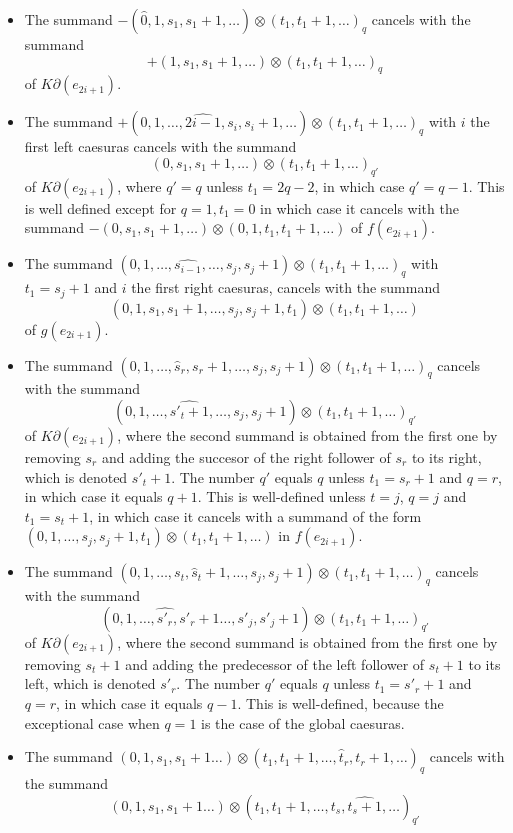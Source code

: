 \begin{itemize}
\item The summand $-(\hat{0},1,s_1,s_1+1,\ldots)\otimes (t_1,t_1+1,\ldots)_q$ cancels with the summand
\[+(1,s_1,s_1+1,\ldots)\otimes(t_1,t_1+1,\ldots)_q\]
 of $K\partial(e_{2i+1})$.
\item The summand $+(0,1,\ldots,\widehat{2i-1},s_i,s_i+1,\ldots)\otimes (t_1,t_1+1,\ldots)_q$ with $i$ the first left caesuras cancels with the summand
\[(0,s_1,s_1+1,\ldots)\otimes(t_1,t_1+1,\ldots)_{q'}\]
of $K\partial(e_{2i+1})$, where $q'=q$ unless $t_1 = 2q-2$, in which case $q'=q-1$. This is well defined except for $q=1,t_1 = 0$ in which case it cancels with the summand $-(0,s_1,s_1+1,\ldots)\otimes (0,1,t_1,t_1+1,\ldots)$ of $f(e_{2i+1})$.
\item The summand $(0,1,\ldots,\widehat{s_{i-1}},\ldots,s_j,s_j+1)\otimes (t_1,t_1+1,\ldots)_q$ with $t_1=s_j+1$ and $i$ the first right caesuras, cancels with the summand
\[(0,1,s_1,s_1+1,\ldots,s_j,s_j+1,t_1)\otimes(t_1,t_1+1,\ldots) \]
of $g(e_{2i+1})$. 
\item The summand $(0,1,\ldots,\widehat{s}_r,s_r+1,\ldots,s_j,s_j+1)\otimes (t_1,t_1+1,\ldots)_q$ cancels with the summand
\[(0,1,\ldots,\widehat{s'_t+1},\ldots,s_j,s_j+1)\otimes (t_1,t_1+1,\ldots)_{q'}\]
of $K\partial(e_{2i+1})$, where the second summand is obtained from the first one by removing $s_r$ and adding the succesor of the right follower of $s_r$ to its right, which is denoted $s'_t+1$. The number $q'$ equals $q$ unless $t_1 = s_r+1$ and $q=r$, in which case it equals $q+1$. This is well-defined unless $t=j$, $q=j$ and $t_1=s_t+1$, in which case it cancels with a summand of the form $(0,1,\ldots,s_{j},s_{j}+1,t_1)\otimes (t_1,t_1+1,\ldots)$ in $f(e_{2i+1})$. 
\item The summand $(0,1,\ldots,s_t,\widehat{s}_t+1,\ldots,s_j,s_j+1)\otimes (t_1,t_1+1,\ldots)_q$ cancels with the summand
\[(0,1,\ldots,\widehat{s'_r},s'_r+1\ldots,s'_j,s'_j+1)\otimes (t_1,t_1+1,\ldots)_{q'}\]
of $K\partial(e_{2i+1})$, where the second summand is obtained from the first one by removing $s_t+1$ and adding the predecessor of the left follower of $s_t+1$ to its left, which is denoted $s'_r$. The number $q'$ equals $q$ unless $t_1 = s'_r+1$ and $q=r$, in which case it equals $q-1$. This is well-defined, because the exceptional case when $q=1$ is the case of the global caesuras.
\item The summand $(0,1,s_1,s_1+1\ldots)\otimes (t_1,t_1+1,\ldots,\hat{t}_r,t_r+1,\ldots)_q$ cancels with the summand
\[(0,1,s_1,s_1+1\ldots)\otimes (t_1,t_1+1,\ldots,t_s,\widehat{t_s+1},\ldots)_{q'}\]

\end{itemize}
